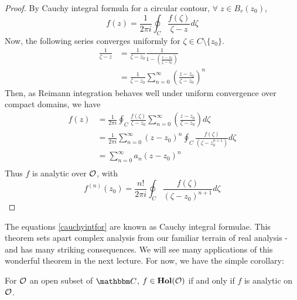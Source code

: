 \documentclass[../ComplexAnalysis_Notes.tex]{subfiles}
\begin{document}
\begin{proof}
By Cauchy integral formula for a circular contour, $\forall\;z\in B_r(z_0)$,
\[f(z) = \frac{1}{2\pi i}\oint_{C} \frac{f(\zeta)}{\zeta - z}d\zeta\]
Now, the following series converges uniformly for $\zeta \in C\setminus \{z_0\}$.
\begin{align*}
\frac{1}{\zeta-z} &= \frac{1}{\zeta - z_0}\frac{1}{1- \left(\frac{z-z_0}{\zeta - z_0}\right)}\\
&= \frac{1}{\zeta - z_0} \sum_{n=0}^\infty \left(\frac{z-z_0}{\zeta - z_0}\right)^n
\end{align*}
Then, as Reimann integration behaves well under uniform convergence over compact domains, we have
\begin{align*}
f(z) &= \frac{1}{2\pi i} \oint_{C} \frac{f(\zeta)}{\zeta - z_0}\sum_{n=0}^\infty \left(\frac{z-z_0}{\zeta - z_0}\right)d\zeta\\
&= \frac{1}{2\pi i}\sum_{n=0}^\infty (z-z_0)^n \oint_{C} \frac{f(\zeta)}{(\zeta - z_0^{n+1})}d\zeta\\
&= \sum_{n=0}^\infty a_n (z-z_0)^n\\
\end{align*}
Thus $f$ is analytic over $\mathcal{O}$, with
\begin{equation}\label{cauchyintfor}
f^{(n)}(z_0) = \frac{n!}{2\pi i}\oint_{C} \frac{f(\zeta)}{(\zeta - z_0)^{n+1}}d\zeta
\end{equation}
\end{proof}
The equations \eqref{cauchyintfor} are known as Cauchy integral formulae. This theorem sets apart complex analysis from our familiar terrain of real analysis - and has many striking consequences. We will see many applications of this wonderful theorem in the next lecture. For now, we have the simple corollary:
\begin{Cor}{}{}
For $\mathcal{O}$ an open subset of $\C$, $f \in \operatorname{\mathbf{Hol}}(\mathcal{O})$ if and only if $f$ is analytic on $\mathcal{O}$.
\end{Cor}
\end{document}

